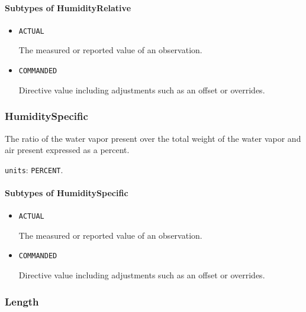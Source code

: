 \paragraph{Subtypes of HumidityRelative}\mbox{}
\label{sec:Subtypes of HumidityRelative}

\begin{itemize}

\item \texttt{ACTUAL}


The measured or reported value of an \gls{observation}.

\item \texttt{COMMANDED}


Directive value including adjustments such as an offset or overrides.


\end{itemize}





\subsubsection{HumiditySpecific}
\label{sec:HumiditySpecific}



The ratio of the water vapor present over the total weight of the water vapor and air present expressed as a percent.



\texttt{units}: \texttt{PERCENT}.

\paragraph{Subtypes of HumiditySpecific}\mbox{}
\label{sec:Subtypes of HumiditySpecific}

\begin{itemize}

\item \texttt{ACTUAL}


The measured or reported value of an \gls{observation}.

\item \texttt{COMMANDED}


Directive value including adjustments such as an offset or overrides.


\end{itemize}





\subsubsection{Length}
\label{sec:Length}




